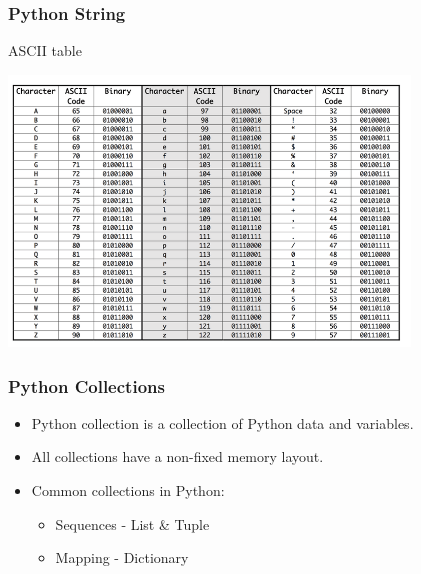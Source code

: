 \documentclass{beamer}
\begin{document}

    \begin{frame}[fragile]
        \frametitle{Python String}
        \begin{exampleblock}{ASCII table}
            \begin{center}
                \includegraphics[width=0.8\textwidth]{figures/ascii-codes.png}
            \end{center}
        \end{exampleblock}
    \end{frame}

    \begin{frame}[fragile]
        \frametitle{Python Collections}
        \begin{itemize}
            \item Python collection is a collection of Python data and variables.
            \item All collections have a non-fixed memory layout.
            \item Common collections in Python:
            \begin{itemize}
                \item Sequences - List \& Tuple
                \item Mapping - Dictionary
            \end{itemize}
        \end{itemize}
    \end{frame}
\end{document}

